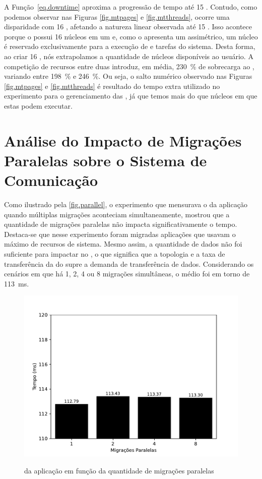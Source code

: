 A Função~\ref{eq.downtime} aproxima a progressão de tempo até 15 \threads. Contudo, como podemos observar nas Figuras \ref{fig.mtpages} e \ref{fig.mtthreads}, ocorre uma disparidade com 16 \threads, afetando a natureza linear observada até 15 \threads. Isso acontece porque o \mppa possui 16 núcleos em um \cluster e, como o \nanvix apresenta um \microkernel assimétrico, um núcleo é reservado exclusivamente para a execução de \threads e tarefas do sistema. Desta forma, ao criar 16 \threads, nós extrapolamos a quantidade de núcleos disponíveis ao usuário. A competição de recursos entre duas \threads introduz, em média, 230~\% de sobrecarga ao \downtime, variando entre 198~\% e 246~\%. Ou seja, o salto numérico observado nas Figuras \ref{fig.mtpages} e \ref{fig.mtthreads} é resultado do tempo extra utilizado no experimento para o gerenciamento das \threads, já que temos mais \threads do que núcleos em que estas podem executar.


\section{Análise do Impacto de Migrações Paralelas sobre o Sistema de Comunicação}

Como ilustrado pela \autoref{fig.parallel}, o experimento que mensurava o \downtime da aplicação quando múltiplas migrações aconteciam simultaneamente, mostrou que a quantidade de migrações paralelas não impacta significativamente o tempo. Destaca-se que nesse experimento foram migradas aplicações que usavam o máximo de recursos de sistema. Mesmo assim, a quantidade de dados não foi suficiente para impactar no \downtime, o que significa que a topologia e a taxa de transferência da \noc do \mppa supre a demanda de transferência de dados. Considerando os cenários em que há 1, 2, 4 ou 8 migrações simultâneas, o \downtime médio foi em torno de 113~ms.


\begin{figure}[ht!]
    \centering
    \caption{\Downtime da aplicação em função da quantidade de migrações paralelas}
    \includegraphics[width=0.7\linewidth]{content/images/parallel.pdf}
    \label{fig.parallel}
\end{figure}

